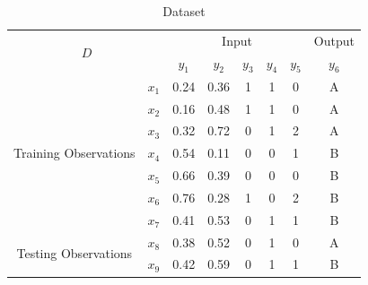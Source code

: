 \documentclass{article}
\begin{document}
\begin{table}[h!]
\centering
\begin{tabular}{|cc|ccccc|c|}
\hline
\multicolumn{2}{|c|}{\multirow{2}{*}{$D$}}                           & \multicolumn{5}{c|}{Input}                                                                                                & \multicolumn{1}{l|}{Output} \\ \cline{3-8} 
\multicolumn{2}{|c|}{}                                               & \multicolumn{1}{c|}{$y_1$} & \multicolumn{1}{c|}{$y_2$} & \multicolumn{1}{c|}{$y_3$} & \multicolumn{1}{c|}{$y_4$} & $y_5$ & $y_6$                       \\ \hline
\multicolumn{1}{|c|}{\multirow{7}{*}{Training Observations}} & $x_1$ & \multicolumn{1}{c|}{0.24}  & \multicolumn{1}{c|}{0.36}  & \multicolumn{1}{c|}{1}     & \multicolumn{1}{c|}{1}     & 0     & A                           \\ \cline{2-8} 
\multicolumn{1}{|c|}{}                                       & $x_2$ & \multicolumn{1}{c|}{0.16}  & \multicolumn{1}{c|}{0.48}  & \multicolumn{1}{c|}{1}     & \multicolumn{1}{c|}{1}     & 0     & A                           \\ \cline{2-8} 
\multicolumn{1}{|c|}{}                                       & $x_3$ & \multicolumn{1}{c|}{0.32}  & \multicolumn{1}{c|}{0.72}  & \multicolumn{1}{c|}{0}     & \multicolumn{1}{c|}{1}     & 2     & A                           \\ \cline{2-8} 
\multicolumn{1}{|c|}{}                                       & $x_4$ & \multicolumn{1}{c|}{0.54}  & \multicolumn{1}{c|}{0.11}  & \multicolumn{1}{c|}{0}     & \multicolumn{1}{c|}{0}     & 1     & B                           \\ \cline{2-8} 
\multicolumn{1}{|c|}{}                                       & $x_5$ & \multicolumn{1}{c|}{0.66}  & \multicolumn{1}{c|}{0.39}  & \multicolumn{1}{c|}{0}     & \multicolumn{1}{c|}{0}     & 0     & B                           \\ \cline{2-8} 
\multicolumn{1}{|c|}{}                                       & $x_6$ & \multicolumn{1}{c|}{0.76}  & \multicolumn{1}{c|}{0.28}  & \multicolumn{1}{c|}{1}     & \multicolumn{1}{c|}{0}     & 2     & B                           \\ \cline{2-8} 
\multicolumn{1}{|c|}{}                                       & $x_7$ & \multicolumn{1}{c|}{0.41}  & \multicolumn{1}{c|}{0.53}  & \multicolumn{1}{c|}{0}     & \multicolumn{1}{c|}{1}     & 1     & B                           \\ \hline
\multicolumn{1}{|c|}{\multirow{2}{*}{Testing Observations}}  & $x_8$ & \multicolumn{1}{c|}{0.38}  & \multicolumn{1}{c|}{0.52}  & \multicolumn{1}{c|}{0}     & \multicolumn{1}{c|}{1}     & 0     & A                           \\ \cline{2-8} 
\multicolumn{1}{|c|}{}                                       & $x_9$ & \multicolumn{1}{c|}{0.42}  & \multicolumn{1}{c|}{0.59}  & \multicolumn{1}{c|}{0}     & \multicolumn{1}{c|}{1}     & 1     & B                           \\ \hline
\end{tabular}
\label{tab:dataset1}
\caption{Dataset}
\end{table}
\end{document}
